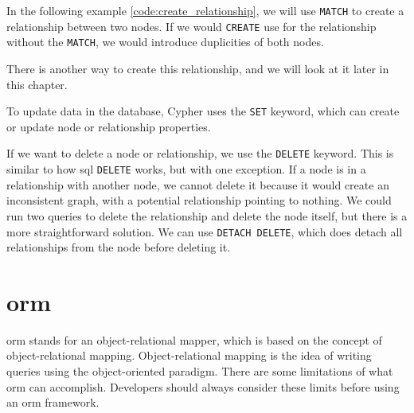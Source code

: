 In the following example \ref{code:create_relationship}, we will use \texttt{MATCH} to create a relationship between two nodes.
If we would \texttt{CREATE} use for the relationship without the \texttt{MATCH}, we would introduce duplicities of both nodes.


There is another way to create this relationship, and we will look at it later in this chapter.

To update data in the database, Cypher uses the \texttt{SET} keyword, which can create or update node or relationship properties.

If we want to delete a node or relationship, we use the \texttt{DELETE} keyword.
This is similar to how \acrshort{sql} \texttt{DELETE} works, but with one exception. If a node is in a relationship
with another node, we cannot delete it because it would create an inconsistent graph, with a potential relationship pointing to nothing. \cite{noauthor_updating_nodate}
We could run two queries to delete the relationship and delete the node itself, but there is a more straightforward solution.
We can use \texttt{DETACH DELETE}, which does detach all relationships from the node before deleting it.

\section{\acrshort{orm}}
\acrshort{orm} stands for an object-relational mapper, which is based on the concept of object-relational mapping.
Object-relational mapping is the idea of writing queries using the object-oriented paradigm.
There are some limitations of what \acrshort{orm} can accomplish. Developers should always consider these limits before using an \acrshort{orm} framework. \cite{mario_hoyos_what_2018}

